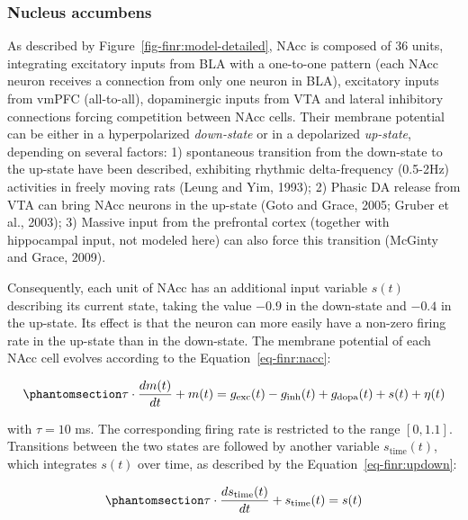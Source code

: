 \documentclass[
  11pt,
  a4paper,
]{scrbook}
\begin{document}
\subsubsection*{Nucleus accumbens}\label{nucleus-accumbens}

As described by Figure~\ref{fig-finr:model-detailed}, NAcc is composed
of 36 units, integrating excitatory inputs from BLA with a one-to-one
pattern (each NAcc neuron receives a connection from only one neuron in
BLA), excitatory inputs from vmPFC (all-to-all), dopaminergic inputs
from VTA and lateral inhibitory connections forcing competition between
NAcc cells. Their membrane potential can be either in a hyperpolarized
\emph{down-state} or in a depolarized \emph{up-state}, depending on
several factors: 1) spontaneous transition from the down-state to the
up-state have been described, exhibiting rhythmic delta-frequency
(0.5-2Hz) activities in freely moving rats (Leung and Yim, 1993); 2)
Phasic DA release from VTA can bring NAcc neurons in the up-state (Goto
and Grace, 2005; Gruber et al., 2003); 3) Massive input from the
prefrontal cortex (together with hippocampal input, not modeled here)
can also force this transition (McGinty and Grace, 2009).

Consequently, each unit of NAcc has an additional input variable
\(s(t)\) describing its current state, taking the value \(-0.9\) in the
down-state and \(-0.4\) in the up-state. Its effect is that the neuron
can more easily have a non-zero firing rate in the up-state than in the
down-state. The membrane potential of each NAcc cell evolves according
to the Equation~\ref{eq-finr:nacc}:

\begin{equation}\phantomsection\label{eq-finr:nacc}{
    \tau \cdot \frac{dm(t)}{dt} +  m(t) = g_{\text{exc}}(t) - g_{\text{inh}}(t) + g_{\text{dopa}}(t)+ s(t) + \eta(t)
}\end{equation}

with \(\tau=10\) ms. The corresponding firing rate is restricted to the
range \([0, 1.1]\). Transitions between the two states are followed by
another variable \(s_{\text{time}}(t)\), which integrates \(s(t)\) over
time, as described by the Equation~\ref{eq-finr:updown}:

\begin{equation}\phantomsection\label{eq-finr:updown}{
    \tau \cdot \frac{ds_{\text{time}}(t)}{dt} +  s_{\text{time}}(t) = s(t)
}\end{equation}
\end{document}

